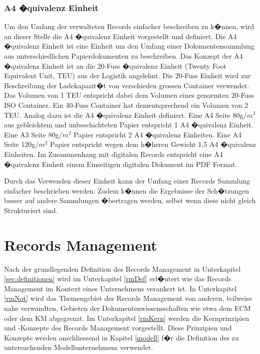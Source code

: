 \documentclass[a4paper,twoside,10pt]{report}
\begin{document}
\subsection{A4 �quivalenz Einheit}
Um den Umfang der verwalteten Records einfacher beschreiben zu k�nnen, wird an dieser Stelle die A4 �quivalenz Einheit vorgestellt und definiert. Die A4 �quivalenz Einheit ist eine Einheit um den Umfang einer Dokumentensammlung aus unterschiedlichen Papierdokumenten zu beschreiben. Das Konzept der A4 �quivalenz Einheit ist an die 20-Fuss �quivalenz Einheit (Twenty Foot Equivalent Unit, TEU) aus der Logistik angelehnt. Die 20-Fuss Einheit wird zur Beschreibung der Ladekapazit�t von verschieden grossen Container verwendet. Das Volumen von 1 TEU entspricht dabei dem Volumen eines genormten 20-Fuss ISO Container. Ein 40-Fuss Container hat dementsprechend ein Volumen von 2 TEU. Analog dazu ist die A4 �quivalenz Einheit definiert. Eine A4 Seite 80g/$m^2$  aus gebleichtem und unbeschichteten Papier entspricht 1 A4 �quivalenz Einheit. Eine A3 Seite 80g/$m^2$ Papier entspricht 2 A4 �quivalenz Einheiten. Eine A4 Seite 120g/$m^2$ Papier entspricht wegen dem h�heren Gewicht 1,5 A4 �quivalenz Einheiten. Im Zusammenhang mit digitalen Records entspricht eine A4 �quivalenz Einheit einem Einseitigen digitalen Dokument im PDF Format. 

Durch das Verwenden dieser Einheit kann der Umfang einer Records Sammlung einfacher beschrieben werden. Zudem k�nnen die Ergebnisse der Sch�tzungen besser auf andere Sammlungen �bertragen werden, selbst wenn diese nicht gleich Strukturiert sind.\cite{teu} 


\acresetall
\cleardoublepage
\chapter{Records Management}\label{RM}
Nach der grundlegenden Definition des Records Management in Unterkapitel \ref{sec:definitionen} wird im Unterkapitel \ref{rmDef} erl�utert wie das Records Management im Kontext eines Unternehmens verankert ist. In Unterkapitel \ref{rmNot} wird das Themengebiet des Records Management von anderen, teilweise nahe verwandten, Gebieten der Dokumentenwissensschaften wie etwa dem \ac{ECM} oder dem \ac{KM} abgegrenzt. Im Unterkapitel \ref{rmKern} werden die Kernprinzipien und -Konzepte des Records Management vorgestellt. Diese Prinzipien und Konzepte werden anschliessend in Kapitel \ref{modell} f�r die Definition des zu untersuchenden Modellunternehmens verwendet.
\end{document}
